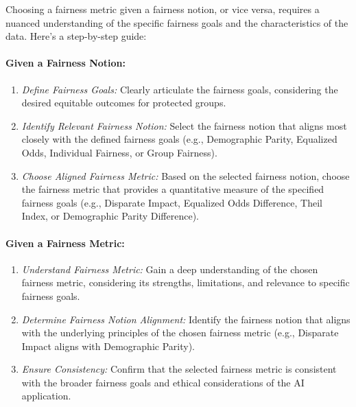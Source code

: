 Choosing a fairness metric given a fairness notion, or vice versa, requires a nuanced understanding of the specific fairness goals and the characteristics of the data. Here's a step-by-step guide:

\paragraph{Given a Fairness Notion:}

\begin{enumerate}
 
    \item \emph{Define Fairness Goals:} Clearly articulate the fairness goals, considering the desired equitable outcomes for protected groups.
 
    \item \emph{Identify Relevant Fairness Notion:} Select the fairness notion that aligns most closely with the defined fairness goals (e.g., Demographic Parity, Equalized Odds, Individual Fairness, or Group Fairness).
 
    \item \emph{Choose Aligned Fairness Metric:} Based on the selected fairness notion, choose the fairness metric that provides a quantitative measure of the specified fairness goals (e.g., Disparate Impact, Equalized Odds Difference, Theil Index, or Demographic Parity Difference).

\end{enumerate}

\paragraph{Given a Fairness Metric:}

\begin{enumerate}

    \item \emph{Understand Fairness Metric:} Gain a deep understanding of the chosen fairness metric, considering its strengths, limitations, and relevance to specific fairness goals.

    \item \emph{Determine Fairness Notion Alignment:} Identify the fairness notion that aligns with the underlying principles of the chosen fairness metric (e.g., Disparate Impact aligns with Demographic Parity).
 
    \item \emph{Ensure Consistency:} Confirm that the selected fairness metric is consistent with the broader fairness goals and ethical considerations of the AI application.

\end{enumerate}

